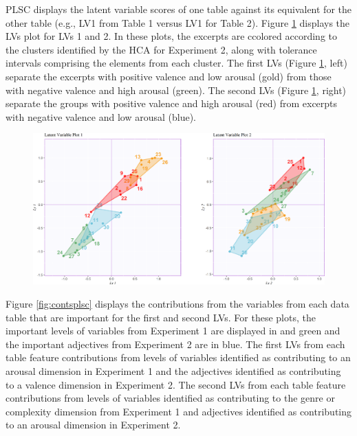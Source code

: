 \documentclass[
  english,
  man,floatsintext]{apa6}
\begin{document}
PLSC displays the latent variable scores of one table against its equivalent for the other table (e.g., LV1 from Table 1 versus LV1 for Table 2). Figure \ref{fig:factorplotsPLSC} displays the LVs plot for LVs 1 and 2. In these plots, the excerpts are ccolored according to the clusters identified by the HCA for Experiment 2, along with tolerance intervals comprising the elements from each cluster. The first LVs (Figure \ref{fig:factorplotsPLSC}, left) separate the excerpts with positive valence and low arousal (gold) from those with negative valence and high arousal (green). The second LVs (Figure \ref{fig:factorplotsPLSC}, right) separate the groups with positive valence and high arousal (red) from excerpts with negative valence and low arousal (blue).

\begin{figure}   
  \centering  
  \caption{PLSC: Latent variables for Experiment 1 contingency table (horizontal, $x$) plotted against latent variables for Experiment 2 contingency table (vertical, $y$), including tolerance intervals, colored according to the groups revealed by Experiment 2.}
  \label{fig:factorplotsPLSC}
    \includegraphics{./Music-Descriptor-Space_files/figure-latex/factorplotsPLSCcode-1.png}
  \caption*{}
\end{figure}

Figure \ref{fig:contsplsc} displays the contributions from the variables from each data table that are important for the first and second LVs. For these plots, the important levels of variables from Experiment 1 are displayed in and green and the important adjectives from Experiment 2 are in blue. The first LVs from each table feature contributions from levels of variables identified as contributing to an arousal dimension in Experiment 1 and the adjectives identified as contributing to a valence dimension in Experiment 2. The second LVs from each table feature contributions from levels of variables identified as contributing to the genre or complexity dimension from Experiment 1 and adjectives identified as contributing to an arousal dimension in Experiment 2.
\end{document}
